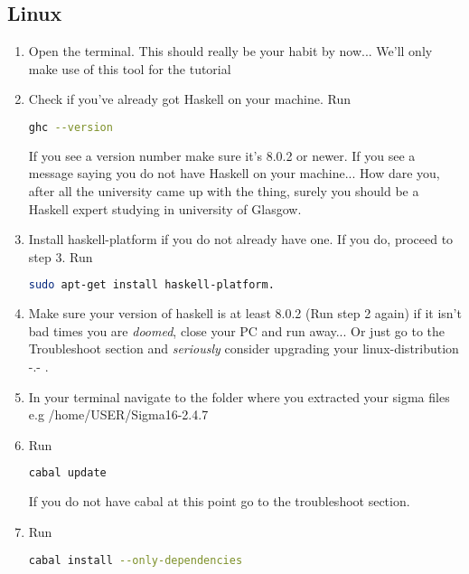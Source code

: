 \documentclass[11pt,a4paper]{article}
\begin{document}
 \subsection{Linux}
 \begin{enumerate}
      

   \item Open the terminal. This should really be your habit by now... We'll only make use of this tool for the tutorial
   \item Check if you've already got Haskell on your machine. Run 
\begin{lstlisting}[language=Bash]
ghc --version
\end{lstlisting}
If you see a version number make sure it's 8.0.2 or newer. If you see a message saying you do not have Haskell on your machine... How dare you, after all the university came up with the thing, surely you should be a Haskell expert studying in university of Glasgow.
   \item Install haskell-platform if you do not already have one. If you do, proceed to step 3. Run
\begin{lstlisting}[language=Bash]
sudo apt-get install haskell-platform.
\end{lstlisting}
    \item Make sure your version of haskell is at least 8.0.2 (Run step 2 again) if it isn't bad times you are \textit{doomed}, close your PC and run away... Or just go to the Troubleshoot section and \textit{seriously} consider upgrading your linux-distribution -.- .
   \item In your terminal navigate to the folder where you extracted your sigma files e.g /home/USER/Sigma16-2.4.7
   \item Run
\begin{lstlisting}[language=Bash]
cabal update
\end{lstlisting}
    If you do not have cabal at this point go to the troubleshoot section.
   \item Run
\begin{lstlisting}[language=Bash]
cabal install --only-dependencies
\end{lstlisting}


\end{enumerate}
\end{document}
